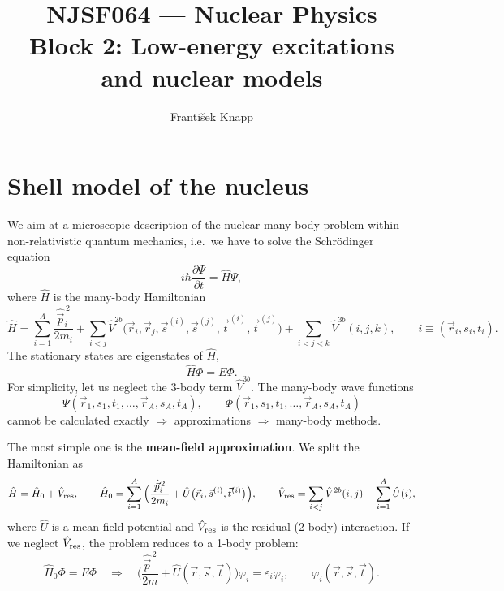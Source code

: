 \documentclass[11pt,a4paper]{article}
\title{NJSF064 --- Nuclear Physics\\[2mm]\large Block 2: Low-energy excitations and nuclear models}
\author{František Knapp}
\date{}
\newcommand{\op}[1]{\hat{#1}}
\begin{document}
\maketitle


\section{Shell model of the nucleus}
We aim at a microscopic description of the nuclear many-body problem within non-relativistic quantum mechanics, i.e.\ we have to solve the Schr\"odinger equation
\[
i\hbar\frac{\partial\Psi}{\partial t}=\op H\Psi ,
\]
where $\op H$ is the many-body Hamiltonian
\[
\op H=\sum_{i=1}^A\frac{\op{\vec p}_i^{\,2}}{2m_i}
+\sum_{i<j}\op V^{2b}\big(\vec r_i,\vec r_j,\vec s^{(i)},\vec s^{(j)},\vec t^{(i)},\vec t^{(j)}\big)
+\sum_{i<j<k}\op V^{3b}(i,j,k),
\qquad i\equiv(\vec r_i,s_i,t_i).
\]
The stationary states are eigenstates of $\op H$,
\[
\op H\Phi=E\Phi .
\]
For simplicity, let us neglect the 3-body term $\op V^{3b}$. The many-body wave functions
\[
\Psi(\vec r_1,s_1,t_1,\dots,\vec r_A,s_A,t_A),\qquad \Phi(\vec r_1,s_1,t_1,\dots,\vec r_A,s_A,t_A)
\]
cannot be calculated exactly $\Rightarrow$ approximations $\Rightarrow$ many-body methods.

The most simple one is the \textbf{mean-field approximation}. We split the Hamiltonian as
\[
\op H=\op H_0+\op V_{\rm res},\qquad
\op H_0=\sum_{i=1}^A\Big(\frac{\op{\vec p}_i^{\,2}}{2m_i}+\op U\big(\vec r_i,\vec s^{(i)},\vec t^{(i)}\big)\Big),
\qquad
\op V_{\rm res}=\sum_{i<j}\op V^{2b}(i,j)-\sum_{i=1}^A\op U(i),
\]
where $\op U$ is a mean-field potential and $\op V_{\rm res}$ is the residual (2-body) interaction.
If we neglect $\op V_{\rm res}$, the problem reduces to a 1-body problem:
\[
\op H_0\Phi=E\Phi\quad\Longrightarrow\quad
\Big(\frac{\op{\vec p}^{\,2}}{2m}+\op U(\vec r,\vec s,\vec t)\Big)\varphi_i=\varepsilon_i\varphi_i ,
\qquad \varphi_i(\vec r,\vec s,\vec t).
\]
\end{document}
